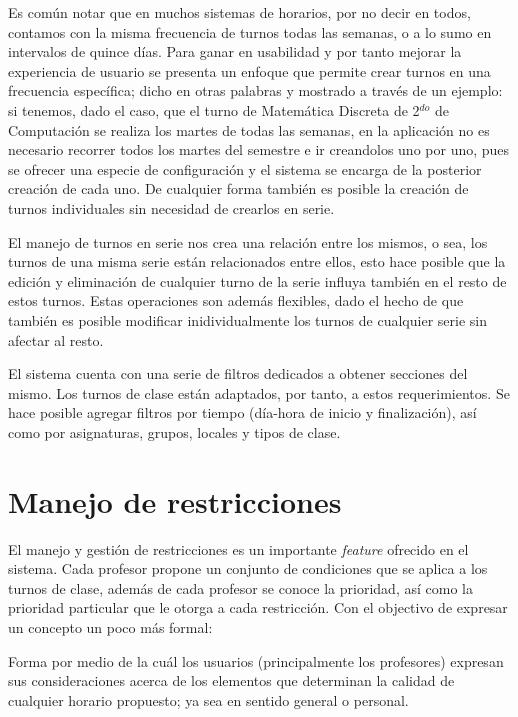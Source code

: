 Es común notar que en muchos sistemas de horarios, por no decir en todos, contamos con la misma frecuencia de turnos todas las semanas, o a lo sumo en intervalos de quince días. Para ganar en usabilidad y por tanto mejorar la experiencia de usuario se presenta un enfoque que permite crear turnos en una frecuencia específica; dicho en otras palabras y mostrado a través de un ejemplo: si tenemos, dado el caso, que el turno de Matemática Discreta de 2$^{do}$ de Computación se realiza los martes de todas las semanas, en la aplicación no es necesario recorrer todos los martes del semestre e ir creandolos uno por uno, pues se ofrecer una especie de configuración y el sistema se encarga de la posterior creación de cada uno. De cualquier forma también  es posible la creación de turnos individuales sin necesidad de crearlos en serie.

El manejo de turnos en serie nos crea una relación entre los mismos, o sea, los turnos de una misma serie están relacionados entre ellos, esto hace posible que la edición y eliminación de cualquier turno de la serie influya también en el resto de estos turnos. Estas operaciones son además flexibles, dado el hecho de que también es posible modificar inidividualmente los turnos de cualquier serie sin afectar al resto.

El sistema cuenta con una serie de filtros dedicados a obtener secciones del mismo. Los turnos de clase están adaptados, por tanto, a estos requerimientos. Se hace posible agregar filtros por tiempo (día-hora de inicio y finalización), así como por asignaturas, grupos, locales y tipos de clase. 

\section{Manejo de restricciones}

El manejo y gestión de restricciones es un importante \textit{feature} ofrecido en el sistema. Cada profesor propone un conjunto de condiciones que se aplica a los turnos de clase, además de cada profesor se conoce la prioridad, así como la prioridad particular que le otorga a cada restricción. 
Con el objectivo de expresar un concepto un poco más formal: 
\begin{dfn}[Restricción]
	Forma por medio de la cuál los usuarios (principalmente los profesores) expresan sus consideraciones acerca de los elementos que determinan la calidad de cualquier horario propuesto; ya sea en sentido general o personal.
\end{dfn} 


